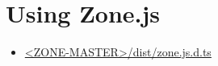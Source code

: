 \section{Using Zone.js}













\begin{itemize}
  \item \href{https://github.com/angular/zone.js/blob/master/dist/zone.js.d.ts}
        {<ZONE-MASTER>/dist/zone.js.d.ts}
\end{itemize}


